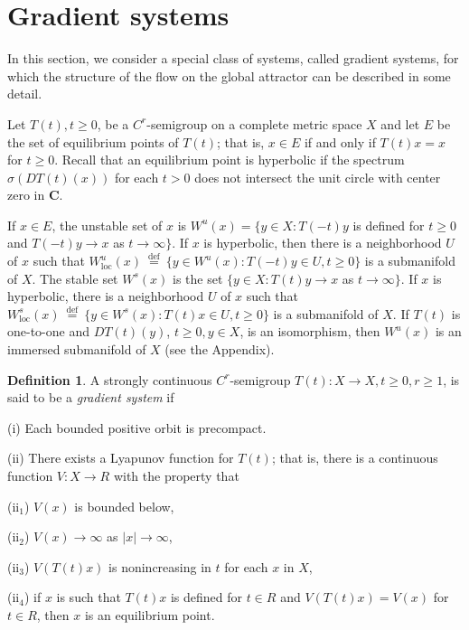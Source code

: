 \documentclass{surv-l}
\theoremstyle{plain}
\theoremstyle{definition}
\newtheorem{definition}[theorem]{Definition}
\numberwithin{equation}{section}
\numberwithin{figure}{chapter}
\begin{document}
\section[Gradient flows]{Gradient systems}\label{sec3.8}

In this section, we consider a special class of systems, called gradient systems, for which the structure of the flow on the global attractor can be described in some detail.

Let $T(t),t\geq 0$, be a $C^{r}$-semigroup on a complete metric space $X$ and let $E$ be the set of equilibrium points of $T(t)$; that is, $x\in E$ if and only if $T(t)x=x$ for $t\geq 0$. Recall that an equilibrium point is hyperbolic if the spectrum $\sigma(DT(t)(x))$ for each $t>0$ does not intersect the unit circle with center zero in \textbf{C}.

If $x\in E$, the unstable set of $x$ is $W^{u}(x)=\{y\in X\!:T(-t)y$ is defined for $t\geq 0$ and $T(-t)y\rightarrow x$ as $t\rightarrow\infty\}$. If $x$ is hyperbolic, then there is a neighborhood $U$ of $x$ such that $W_{\mathrm{loc}}^{u}(x)\ {\overset{\mathrm{def}}{=}}\ \{y\in W^{u}(x)\!:T(-t)y\in U,t\geq 0\}$ is a submanifold of $X$. The stable set $W^{s}(x)$ is the set $\{y\in X\!:T(t)y\rightarrow x$ as $t\rightarrow\infty\}$. If $x$ is hyperbolic, there is a neighborhood $U$ of $x$ such that $W_{\mathrm{loc}}^{s}(x)\ {\overset{\mathrm{def}}{=}}\ \{y\in W^{s}(x)\!:T(t)x\in U,t\geq 0\}$ is a submanifold of $X$. If $T(t)$ is one-to-one and $DT(t)(y)$, $t\geq 0,y\in X$, is an isomorphism, then $W^{u}(x)$ is an immersed submanifold of $X$ (see the Appendix).

\begin{definition}\label{def3.8.1} A strongly continuous $C^{r}$-semigroup $T(t)\!:X\rightarrow X,t\geq 0,r\geq 1$, is said to be a \emph{gradient system} if

(i) Each bounded positive orbit is precompact.

(ii) There exists a Lyapunov function for $T(t)$; that is, there is a continuous function $V\!:X\rightarrow R$ with the property that

(ii$_{1}$) $V(x)$ is bounded below,

(ii$_2$) $V(x)\rightarrow\infty$ as $|x|\rightarrow\infty$,

(ii$_3$) $V(T(t)x)$ is nonincreasing in $t$ for each $x$ in $X$,

(ii$_4$) if $x$ is such that $T(t)x$ is defined for $t\in R$ and $V(T(t)x)=V(x)$ for $t\in R$, then $x$ is an equilibrium point.
\end{definition}
\end{document}
